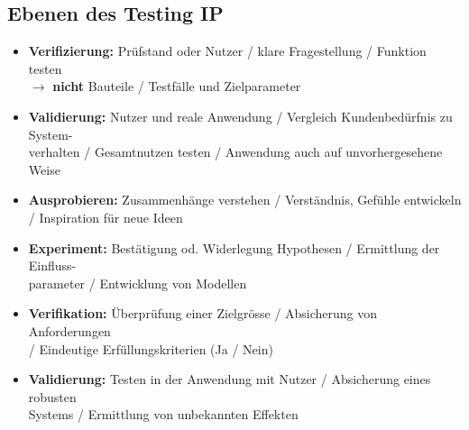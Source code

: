 \subsection{Ebenen des Testing \hfill IP}
    \begin{scriptsize}
        \begin{itemize}
            \item \textbf{Verifizierung:} Prüfstand oder Nutzer / klare Fragestellung / Funktion testen \\$\to$ \textbf{nicht} Bauteile / Testfälle und Zielparameter
            \item \textbf{Validierung:} Nutzer und reale Anwendung / Vergleich Kundenbedürfnis zu System-\\verhalten / Gesamtnutzen testen / Anwendung auch auf unvorhergesehene Weise
            \item \textbf{Ausprobieren:} Zusammenhänge verstehen / Verständnis, Gefühle entwickeln \\/ Inspiration für neue Ideen
            \item \textbf{Experiment:} Bestätigung od. Widerlegung Hypothesen / Ermittlung der Einfluss-\\parameter / Entwicklung von Modellen
            \item \textbf{Verifikation:} Überprüfung einer Zielgrösse / Absicherung von Anforderungen \\/ Eindeutige Erfüllungskriterien (Ja / Nein)
            \item \textbf{Validierung:} Testen in der Anwendung mit Nutzer / Absicherung eines robusten \\ Systems / Ermittlung von unbekannten Effekten
        \end{itemize}
    \end{scriptsize}